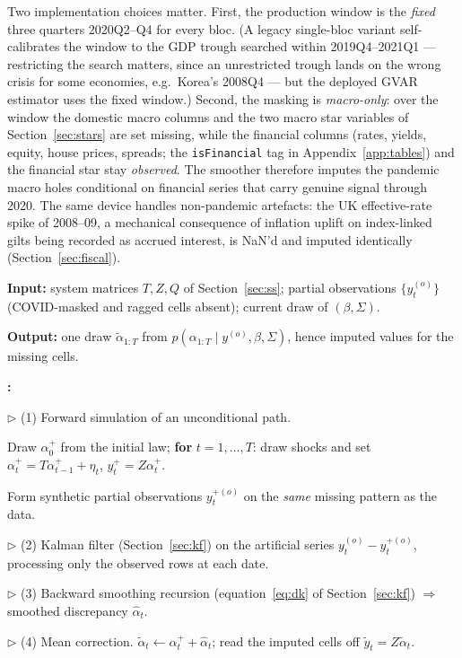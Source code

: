 \documentclass[11pt]{article}
\newcounter{algstep}
\newenvironment{algsteps}
  {\begin{list}{\textbf{\arabic{algstep}:}}{\usecounter{algstep}%
     \setlength{\leftmargin}{2.0em}\setlength{\labelwidth}{1.6em}%
     \setlength{\itemsep}{1.5pt}\setlength{\parsep}{0pt}%
     \setlength{\topsep}{2pt}}}
  {\end{list}}
\newcommand{\algIn}[1]{\noindent\textbf{Input:} #1\par\vspace{1pt}}
\newcommand{\algOut}[1]{\noindent\textbf{Output:} #1\par\vspace{1pt}}
\newcommand{\algKw}[1]{\textbf{#1}}
\newcommand{\algComment}[1]{{\color{black!55}\(\triangleright\) #1}}
\theoremstyle{plain}
\theoremstyle{remark}
\begin{document}
Two implementation choices matter. First, the production window is the
\emph{fixed} three quarters 2020Q2--Q4 for every bloc. (A legacy
single-bloc variant self-calibrates the window to the GDP trough
searched within 2019Q4--2021Q1 --- restricting the search matters, since
an unrestricted trough lands on the wrong crisis for some economies,
e.g.\ Korea's 2008Q4 --- but the deployed GVAR estimator uses the fixed
window.) Second, the masking is \emph{macro-only}: over the window the
domestic macro columns and the two macro star variables of
Section~\ref{sec:stars} are set missing, while the financial columns
(rates, yields, equity, house prices, spreads; the \texttt{isFinancial}
tag in Appendix~\ref{app:tables}) and the financial star stay
\emph{observed}. The smoother therefore imputes the pandemic macro holes
conditional on financial series that carry genuine signal through 2020.
The same device handles non-pandemic artefacts: the UK effective-rate
spike of 2008--09, a mechanical consequence of inflation uplift on
index-linked gilts being recorded as accrued interest, is NaN'd and
imputed identically (Section~\ref{sec:fiscal}).

\begin{algorithm}[!ht]
\caption{Durbin--Koopman simulation smoother with partial observations
(one draw inside the data-augmentation Gibbs sweep;
\texttt{cgl\_bvarV5.m}).}
\label{alg:dksmoother}
\algIn{system matrices $T, Z, Q$ of Section~\ref{sec:ss}; partial
observations $\{y_t^{(o)}\}$ (COVID-masked and ragged cells absent);
current draw of $(\beta,\Sigma)$.}
\algOut{one draw $\tilde\alpha_{1:T}$ from
$p(\alpha_{1:T}\mid y^{(o)},\beta,\Sigma)$, hence imputed values for the
missing cells.}
\begin{algsteps}
\item \algComment{(1) Forward simulation of an unconditional path.}
\item Draw $\alpha_0^{+}$ from the initial law; \algKw{for}
  $t=1,\dots,T$: draw shocks and set
  $\alpha_t^{+}=T\alpha_{t-1}^{+}+\eta_t$, $y_t^{+}=Z\alpha_t^{+}$.
\item Form synthetic partial observations $y_t^{+(o)}$ on the
  \emph{same} missing pattern as the data.
\item \algComment{(2) Kalman filter (Section~\ref{sec:kf}) on the
  artificial series $y_t^{(o)}-y_t^{+(o)}$, processing only the observed
  rows at each date.}
\item \algComment{(3) Backward smoothing recursion
  (equation~\eqref{eq:dk} of Section~\ref{sec:kf}) $\Rightarrow$ smoothed
  discrepancy $\hat\alpha_t$.}
\item \algComment{(4) Mean correction.}
  $\tilde\alpha_t \gets \alpha_t^{+} + \hat\alpha_t$; read the imputed
  cells off $\tilde y_t = Z\tilde\alpha_t$.
\end{algsteps}
\end{algorithm}
\end{document}
